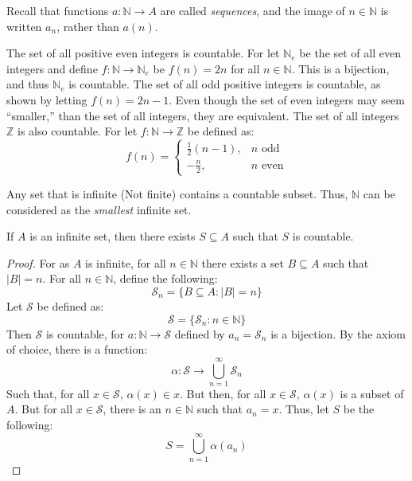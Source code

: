     Recall that functions $a:\mathbb{N}\rightarrow{A}$
    are called \textit{sequences}, and the image of
    $n\in\mathbb{N}$ is written $a_{n}$, rather than
    $a(n)$.
    \begin{example}
        The set of all positive even integers is
        countable. For let $\mathbb{N}_{e}$ be the
        set of all even integers and define
        $f:\mathbb{N}\rightarrow\mathbb{N}_{e}$ be
        $f(n)=2n$ for all $n\in\mathbb{N}$. This is
        a bijection, and thus $\mathbb{N}_{e}$ is
        countable. The set of all odd positive integers
        is countable, as shown by letting
        $f(n)=2n-1$. Even though the set of even
        integers may seem ``smaller,'' than the set of
        all integers, they are equivalent. The set of
        all integers $\mathbb{Z}$ is also countable.
        For let $f:\mathbb{N}\rightarrow\mathbb{Z}$
        be defined as:
        \begin{equation}
            f(n)=
            \begin{cases}
                \frac{1}{2}(n-1),&n\textrm{ odd}\\
                -\frac{n}{2},&n\textrm{ even}
            \end{cases}
        \end{equation}
    \end{example}
    Any set that is infinite (Not finite) contains a
    countable subset. Thus, $\mathbb{N}$ can be
    considered as the \textit{smallest} infinite set.
    \begin{theorem}
        If $A$ is an infinite set, then there exists
        $S\subseteq{A}$ such that $S$ is countable.
    \end{theorem}
    \begin{proof}
        For as $A$ is infinite, for all $n\in\mathbb{N}$
        there exists a set $B\subseteq{A}$ such that
        $|B|=n$. For all $n\in\mathbb{N}$,
        define the following:
        \begin{equation}
            \mathcal{S}_{n}=\{B\subseteq{A}:|B|=n\}
        \end{equation}
        Let $\mathcal{S}$ be defined as:
        \begin{equation}
            \mathcal{S}=\{\mathcal{S}_{n}:n\in\mathbb{N}\}
        \end{equation}
        Then $\mathcal{S}$ is countable, for
        $a:\mathbb{N}\rightarrow\mathcal{S}$ defined
        by $a_{n}=\mathcal{S}_{n}$ is a bijection.
        By the axiom of choice, there is a function:
        \begin{equation}
            \alpha:\mathcal{S}\rightarrow
            \bigcup_{n=1}^{\infty}\mathcal{S}_{n}
        \end{equation}
        Such that, for all $x\in\mathcal{S}$,
        $\alpha(x)\in{x}$. But then, for all
        $x\in\mathcal{S}$, $\alpha(x)$ is a subset
        of $A$. But for all $x\in\mathcal{S}$, there
        is an $n\in\mathbb{N}$ such that
        $a_{n}=x$. Thus, let $S$ be the following:
        \begin{equation}
            S=\bigcup_{n=1}^{\infty}\alpha(a_{n})
        \end{equation}
    \end{proof}
